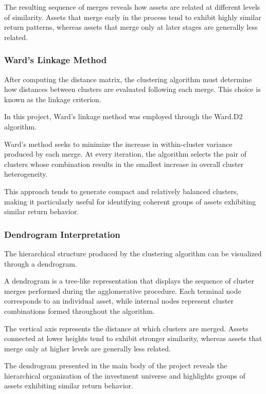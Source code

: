 \documentclass[
  12pt,
  letterpaper,
]{book}
\begin{document}
The resulting sequence of merges reveals how assets are related at
different levels of similarity. Assets that merge early in the process
tend to exhibit highly similar return patterns, whereas assets that
merge only at later stages are generally less related.

\subsubsection{Ward's Linkage Method}\label{wards-linkage-method}

After computing the distance matrix, the clustering algorithm must
determine how distances between clusters are evaluated following each
merge. This choice is known as the linkage criterion.

In this project, Ward's linkage method was employed through the Ward.D2
algorithm.

Ward's method seeks to minimize the increase in within-cluster variance
produced by each merge. At every iteration, the algorithm selects the
pair of clusters whose combination results in the smallest increase in
overall cluster heterogeneity.

This approach tends to generate compact and relatively balanced
clusters, making it particularly useful for identifying coherent groups
of assets exhibiting similar return behavior.

\subsubsection{Dendrogram
Interpretation}\label{dendrogram-interpretation}

The hierarchical structure produced by the clustering algorithm can be
visualized through a dendrogram.

A dendrogram is a tree-like representation that displays the sequence of
cluster merges performed during the agglomerative procedure. Each
terminal node corresponds to an individual asset, while internal nodes
represent cluster combinations formed throughout the algorithm.

The vertical axis represents the distance at which clusters are merged.
Assets connected at lower heights tend to exhibit stronger similarity,
whereas assets that merge only at higher levels are generally less
related.

The dendrogram presented in the main body of the project reveals the
hierarchical organization of the investment universe and highlights
groups of assets exhibiting similar return behavior.
\end{document}
